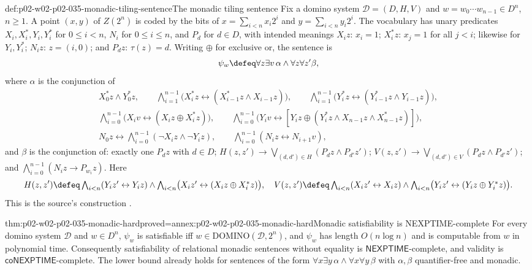 \begin{hbdefinition}{def:p02-w02-p02-035-monadic-tiling-sentence}{The monadic tiling sentence}
Fix a domino system \(\mathcal D=(D,H,V)\) and \(w=w_0\cdots w_{n-1}\in D^n\),
\(n\geq1\).  A point \((x,y)\) of \(Z(2^n)\) is coded by the bits of
\(x=\sum_{i<n}x_i2^i\) and \(y=\sum_{i<n}y_i2^i\).  The vocabulary has unary
predicates \(X_i,X_i^{*},Y_i,Y_i^{*}\) for \(0\leq i<n\), \(N_i\) for
\(0\leq i\leq n\), and \(P_d\) for \(d\in D\), with intended meanings
\(X_iz\): \(x_i=1\); \(X_i^{*}z\): \(x_j=1\) for all \(j<i\); likewise for
\(Y_i,Y_i^{*}\); \(N_iz\): \(z=(i,0)\); and \(P_dz\): \(\tau(z)=d\).  Writing
\(\oplus\) for exclusive or, the sentence is
\[
 \psi_w\defeq\forall z\exists v\,\alpha\land\forall z\forall z'\beta,
\]
where \(\alpha\) is the conjunction of
\[
\begin{gathered}
 X_0^{*}z\land Y_0^{*}z,\qquad
 \textstyle\bigwedge_{i=1}^{n-1}\bigl(X_i^{*}z\leftrightarrow(X_{i-1}^{*}z\land X_{i-1}z)\bigr),\qquad
 \textstyle\bigwedge_{i=1}^{n-1}\bigl(Y_i^{*}z\leftrightarrow(Y_{i-1}^{*}z\land Y_{i-1}z)\bigr),\\
 \textstyle\bigwedge_{i=0}^{n-1}\bigl(X_iv\leftrightarrow(X_iz\oplus X_i^{*}z)\bigr),\qquad
 \textstyle\bigwedge_{i=0}^{n-1}\bigl(Y_iv\leftrightarrow
   [Y_iz\oplus(Y_i^{*}z\land X_{n-1}z\land X_{n-1}^{*}z)]\bigr),\\
 N_0z\leftrightarrow\textstyle\bigwedge_{i=0}^{n-1}(\neg X_iz\land\neg Y_iz),\qquad
 \textstyle\bigwedge_{i=0}^{n-1}(N_iz\leftrightarrow N_{i+1}v),
\end{gathered}
\]
and \(\beta\) is the conjunction of: exactly one \(P_dz\) with \(d\in D\);
\(H(z,z')\to\bigvee_{(d,d')\in H}(P_dz\land P_{d'}z')\);
\(V(z,z')\to\bigvee_{(d,d')\in V}(P_dz\land P_{d'}z')\); and
\(\bigwedge_{i=0}^{n-1}(N_iz\to P_{w_i}z)\).  Here
\[
 H(z,z')\defeq\textstyle\bigwedge_{i<n}(Y_iz'\leftrightarrow Y_iz)\land
   \bigwedge_{i<n}\bigl(X_iz'\leftrightarrow(X_iz\oplus X_i^{*}z)\bigr),
 \quad
 V(z,z')\defeq\textstyle\bigwedge_{i<n}(X_iz'\leftrightarrow X_iz)\land
   \bigwedge_{i<n}\bigl(Y_iz'\leftrightarrow(Y_iz\oplus Y_i^{*}z)\bigr).
\]
This is the source's construction \cite[proof of thm.~6.2.13]{BorgerGradelGurevich1997}.
\end{hbdefinition}

\begin{hbtheorem}{thm:p02-w02-p02-035-monadic-hard}{proved=annex:p02-w02-p02-035-monadic-hard}{Monadic satisfiability is NEXPTIME-complete}
For every domino system \(\mathcal D\) and \(w\in D^n\), \(\psi_w\) is
satisfiable iff \(w\in\mathrm{DOMINO}(\mathcal D,2^n)\), and \(\psi_w\) has
length \(O(n\log n)\) and is computable from \(w\) in polynomial time.
Consequently satisfiability of relational monadic sentences without equality
is \(\mathsf{NEXPTIME}\)-complete, and validity is
\(\mathsf{coNEXPTIME}\)-complete.  The lower bound already holds for sentences
of the form \(\forall x\exists y\,\alpha\land\forall x\forall y\,\beta\) with
\(\alpha,\beta\) quantifier-free and monadic.
\end{hbtheorem}

